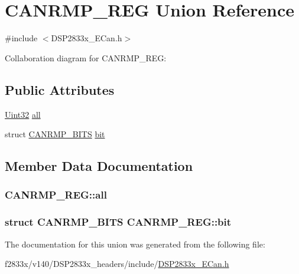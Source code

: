 \hypertarget{union_c_a_n_r_m_p___r_e_g}{}\section{C\+A\+N\+R\+M\+P\+\_\+\+R\+E\+G Union Reference}
\label{union_c_a_n_r_m_p___r_e_g}


{\ttfamily \#include $<$D\+S\+P2833x\+\_\+\+E\+Can.\+h$>$}



Collaboration diagram for C\+A\+N\+R\+M\+P\+\_\+\+R\+E\+G\+:
\subsection*{Public Attributes}
\begin{DoxyCompactItemize}
\item 
\hyperlink{_d_s_p2833x___device_8h_aba99025e657f892beb7ff31cecf64653}{Uint32} \hyperlink{union_c_a_n_r_m_p___r_e_g_a4d81d8111508167c8f80bee466a25ad9}{all}
\item 
struct \hyperlink{struct_c_a_n_r_m_p___b_i_t_s}{C\+A\+N\+R\+M\+P\+\_\+\+B\+I\+T\+S} \hyperlink{union_c_a_n_r_m_p___r_e_g_a77aaf8958ca5983f1632e29ef949fe12}{bit}
\end{DoxyCompactItemize}


\subsection{Member Data Documentation}
\hypertarget{union_c_a_n_r_m_p___r_e_g_a4d81d8111508167c8f80bee466a25ad9}{}
\subsubsection[{all}]{ C\+A\+N\+R\+M\+P\+\_\+\+R\+E\+G\+::all}\label{union_c_a_n_r_m_p___r_e_g_a4d81d8111508167c8f80bee466a25ad9}
\hypertarget{union_c_a_n_r_m_p___r_e_g_a77aaf8958ca5983f1632e29ef949fe12}{}
\subsubsection[{bit}]{\setlength{\rightskip}{0pt plus 5cm}struct {\bf C\+A\+N\+R\+M\+P\+\_\+\+B\+I\+T\+S} C\+A\+N\+R\+M\+P\+\_\+\+R\+E\+G\+::bit}\label{union_c_a_n_r_m_p___r_e_g_a77aaf8958ca5983f1632e29ef949fe12}


The documentation for this union was generated from the following file\+:\begin{DoxyCompactItemize}
\item 
f2833x/v140/\+D\+S\+P2833x\+\_\+headers/include/\hyperlink{_d_s_p2833x___e_can_8h}{D\+S\+P2833x\+\_\+\+E\+Can.\+h}\end{DoxyCompactItemize}
